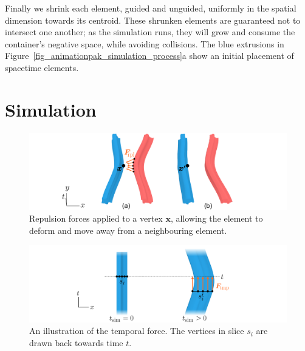 Finally we shrink each element, guided and unguided, uniformly in the spatial dimension
towards its centroid.  These shrunken elements are
guaranteed not to intersect one another; as the simulation runs, they
will grow and consume the container's negative space, while avoiding
collisions.
The blue extrusions in Figure~\ref{fig_animationpak_simulation_process}a show an
initial placement of spacetime elements.


\section{Simulation}
\label{animationpak_simulation}

\begin{figure} [t]
\centering
\includegraphics[width=1.0\textwidth]{figures/animationpak/repulsion_force.pdf} 
\caption[Repulsion forces applied to a vertex $\bm{x}$]
{\label{fig_animationpak_repulsion_force} 
Repulsion forces applied to a vertex $\bm{x}$, 
allowing the element to deform and move away from a neighbouring element.}
\end{figure}

\begin{figure}[t]
\centering
\includegraphics[width=1.0\textwidth]{figures/animationpak/t_force.pdf} 
\caption[An illustration of the temporal force]
{\label{fig_animationpak_t_force} 
An illustration of the temporal force.  The vertices in slice
$s_i$ are drawn back towards time $t$.
}
\end{figure}

